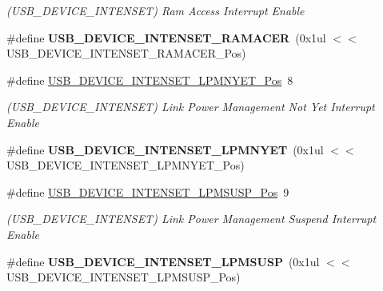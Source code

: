 \begin{DoxyCompactItemize}
\begin{DoxyCompactList}\small\item\em (U\+S\+B\+\_\+\+D\+E\+V\+I\+C\+E\+\_\+\+I\+N\+T\+E\+N\+S\+E\+T) Ram Access Interrupt Enable \end{DoxyCompactList}\item 
\hypertarget{group___s_a_m_l21___u_s_b_ga820b78747c2c8011dde08f2d6e63f30d}{}\#define {\bfseries U\+S\+B\+\_\+\+D\+E\+V\+I\+C\+E\+\_\+\+I\+N\+T\+E\+N\+S\+E\+T\+\_\+\+R\+A\+M\+A\+C\+E\+R}~(0x1ul $<$$<$ U\+S\+B\+\_\+\+D\+E\+V\+I\+C\+E\+\_\+\+I\+N\+T\+E\+N\+S\+E\+T\+\_\+\+R\+A\+M\+A\+C\+E\+R\+\_\+\+Pos)\label{group___s_a_m_l21___u_s_b_ga820b78747c2c8011dde08f2d6e63f30d}

\item 
\hypertarget{group___s_a_m_l21___u_s_b_gac25ebe4d202de9447042d89bc2b09369}{}\#define \hyperlink{group___s_a_m_l21___u_s_b_gac25ebe4d202de9447042d89bc2b09369}{U\+S\+B\+\_\+\+D\+E\+V\+I\+C\+E\+\_\+\+I\+N\+T\+E\+N\+S\+E\+T\+\_\+\+L\+P\+M\+N\+Y\+E\+T\+\_\+\+Pos}~8\label{group___s_a_m_l21___u_s_b_gac25ebe4d202de9447042d89bc2b09369}

\begin{DoxyCompactList}\small\item\em (U\+S\+B\+\_\+\+D\+E\+V\+I\+C\+E\+\_\+\+I\+N\+T\+E\+N\+S\+E\+T) Link Power Management Not Yet Interrupt Enable \end{DoxyCompactList}\item 
\hypertarget{group___s_a_m_l21___u_s_b_ga6da27c18bf646e8587da61dd74a442a4}{}\#define {\bfseries U\+S\+B\+\_\+\+D\+E\+V\+I\+C\+E\+\_\+\+I\+N\+T\+E\+N\+S\+E\+T\+\_\+\+L\+P\+M\+N\+Y\+E\+T}~(0x1ul $<$$<$ U\+S\+B\+\_\+\+D\+E\+V\+I\+C\+E\+\_\+\+I\+N\+T\+E\+N\+S\+E\+T\+\_\+\+L\+P\+M\+N\+Y\+E\+T\+\_\+\+Pos)\label{group___s_a_m_l21___u_s_b_ga6da27c18bf646e8587da61dd74a442a4}

\item 
\hypertarget{group___s_a_m_l21___u_s_b_gaba276142fac784eaa3019c216ea34e6b}{}\#define \hyperlink{group___s_a_m_l21___u_s_b_gaba276142fac784eaa3019c216ea34e6b}{U\+S\+B\+\_\+\+D\+E\+V\+I\+C\+E\+\_\+\+I\+N\+T\+E\+N\+S\+E\+T\+\_\+\+L\+P\+M\+S\+U\+S\+P\+\_\+\+Pos}~9\label{group___s_a_m_l21___u_s_b_gaba276142fac784eaa3019c216ea34e6b}

\begin{DoxyCompactList}\small\item\em (U\+S\+B\+\_\+\+D\+E\+V\+I\+C\+E\+\_\+\+I\+N\+T\+E\+N\+S\+E\+T) Link Power Management Suspend Interrupt Enable \end{DoxyCompactList}\item 
\hypertarget{group___s_a_m_l21___u_s_b_gaab3b792844cdc6f668ac4d4510b2a190}{}\#define {\bfseries U\+S\+B\+\_\+\+D\+E\+V\+I\+C\+E\+\_\+\+I\+N\+T\+E\+N\+S\+E\+T\+\_\+\+L\+P\+M\+S\+U\+S\+P}~(0x1ul $<$$<$ U\+S\+B\+\_\+\+D\+E\+V\+I\+C\+E\+\_\+\+I\+N\+T\+E\+N\+S\+E\+T\+\_\+\+L\+P\+M\+S\+U\+S\+P\+\_\+\+Pos)\label{group___s_a_m_l21___u_s_b_gaab3b792844cdc6f668ac4d4510b2a190}


\end{DoxyCompactItemize}

